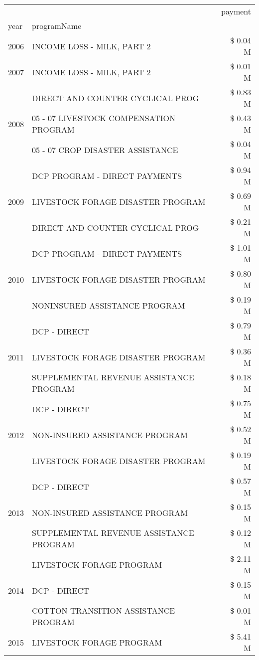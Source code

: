 \begin{tabular}{llr}
\toprule
 &  & payment \\
year & programName &  \\
\midrule
2006 & INCOME LOSS - MILK, PART 2 & \$ 0.04 M \\
\cline{1-3}
2007 & INCOME LOSS - MILK, PART 2 & \$ 0.01 M \\
\cline{1-3}
\multirow[t]{3}{*}{2008} & DIRECT AND COUNTER CYCLICAL PROG & \$ 0.83 M \\
 & 05 - 07 LIVESTOCK COMPENSATION PROGRAM & \$ 0.43 M \\
 & 05 - 07 CROP DISASTER ASSISTANCE & \$ 0.04 M \\
\cline{1-3}
\multirow[t]{3}{*}{2009} & DCP PROGRAM - DIRECT PAYMENTS & \$ 0.94 M \\
 & LIVESTOCK FORAGE DISASTER  PROGRAM & \$ 0.69 M \\
 & DIRECT AND COUNTER CYCLICAL PROG & \$ 0.21 M \\
\cline{1-3}
\multirow[t]{3}{*}{2010} & DCP PROGRAM - DIRECT PAYMENTS & \$ 1.01 M \\
 & LIVESTOCK FORAGE DISASTER  PROGRAM & \$ 0.80 M \\
 & NONINSURED ASSISTANCE PROGRAM & \$ 0.19 M \\
\cline{1-3}
\multirow[t]{3}{*}{2011} & DCP - DIRECT & \$ 0.79 M \\
 & LIVESTOCK FORAGE DISASTER PROGRAM & \$ 0.36 M \\
 & SUPPLEMENTAL REVENUE ASSISTANCE PROGRAM & \$ 0.18 M \\
\cline{1-3}
\multirow[t]{3}{*}{2012} & DCP - DIRECT & \$ 0.75 M \\
 & NON-INSURED ASSISTANCE PROGRAM & \$ 0.52 M \\
 & LIVESTOCK FORAGE DISASTER PROGRAM & \$ 0.19 M \\
\cline{1-3}
\multirow[t]{3}{*}{2013} & DCP - DIRECT & \$ 0.57 M \\
 & NON-INSURED ASSISTANCE PROGRAM & \$ 0.15 M \\
 & SUPPLEMENTAL REVENUE ASSISTANCE PROGRAM & \$ 0.12 M \\
\cline{1-3}
\multirow[t]{3}{*}{2014} & LIVESTOCK FORAGE PROGRAM & \$ 2.11 M \\
 & DCP - DIRECT & \$ 0.15 M \\
 & COTTON TRANSITION ASSISTANCE PROGRAM & \$ 0.01 M \\
\cline{1-3}
\multirow[t]{3}{*}{2015} & LIVESTOCK FORAGE PROGRAM & \$ 5.41 M \\

\end{tabular}
